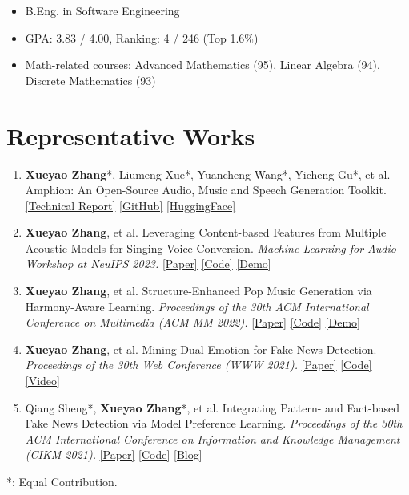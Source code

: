 \documentclass{resume}
\begin{document}
{
  \small
  \begin{itemize}
    \item B.Eng. in Software Engineering
    \item GPA: 3.83 / 4.00, Ranking: 4 / 246 (Top 1.6\%)
    \item Math-related courses: Advanced Mathematics (95), Linear Algebra (94), Discrete
          Mathematics (93)
  \end{itemize}
}

\section{Representative Works}

\begin{enumerate}\itemsep 0.5em
  \item \textbf{Xueyao Zhang}*, Liumeng Xue*, Yuancheng Wang*, Yicheng Gu*, et al. Amphion: An Open-Source Audio, Music and Speech Generation Toolkit. \href{https://arxiv.org/pdf/2312.09911.pdf}{[Technical Report]} \href{https://github.com/open-mmlab/Amphion}{[GitHub]} \href{https://huggingface.co/amphion}{[HuggingFace]}
  \item \textbf{Xueyao Zhang}, et al. Leveraging Content-based Features from Multiple Acoustic Models for Singing Voice Conversion. \textit{Machine Learning for Audio Workshop at NeuIPS 2023.} \href{https://arxiv.org/pdf/2310.11160.pdf}{[Paper]} \href{https://github.com/open-mmlab/Amphion/tree/main/egs/svc/MultipleContentsSVC}{[Code]} \href{https://www.zhangxueyao.com/data/MultipleContentsSVC/index.html}{[Demo]}
  \item \textbf{Xueyao Zhang}, et al. Structure-Enhanced Pop Music Generation via Harmony-Aware Learning. \textit{Proceedings of the 30th ACM International Conference on Multimedia (ACM MM 2022).} \href{https://dl.acm.org/doi/10.1145/3503161.3548084}{[Paper]} \href{https://github.com/RMSnow/HAT}{[Code]} \href{https://www.zhangxueyao.com/data/HAT/demo.html}{[Demo]}
  \item \textbf{Xueyao Zhang}, et al. Mining Dual Emotion for Fake News Detection. \textit{Proceedings of the 30th Web Conference (WWW 2021).} \href{https://dl.acm.org/doi/pdf/10.1145/3442381.3450004}{[Paper]} \href{https://github.com/RMSnow/WWW2021}{[Code]} \href{https://www.bilibili.com/video/BV13o4y1m7c3}{[Video]}
  \item Qiang Sheng*, \textbf{Xueyao Zhang}*, et al. Integrating Pattern- and
        Fact-based Fake News Detection via Model Preference Learning.
        \textit{Proceedings of the 30th ACM International Conference on Information and
          Knowledge Management (CIKM 2021).} \href{https://dl.acm.org/doi/10.1145/3459637.3482440}{[Paper]}
          \href{https://github.com/ICTMCG/Pref-FEND}{[Code]}
          \href{https://zhuanlan.zhihu.com/p/414464291}{[Blog]}
\end{enumerate}
*: Equal Contribution.
\end{document}
